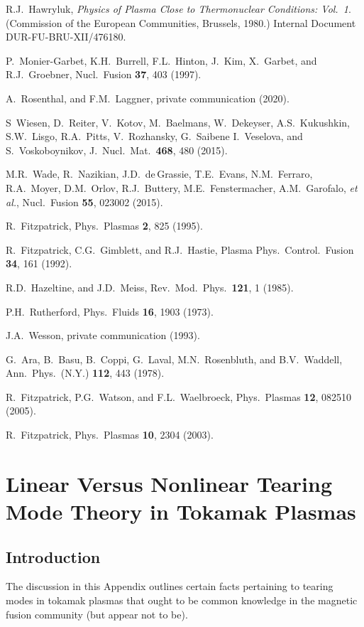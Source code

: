 \documentclass[12pt,prb,aps]{revtex4-1}
\begin{document}
\begin{thebibliography}{99}
 R.J.~Hawryluk, {\em Physics of Plasma Close to Thermonuclear Conditions: Vol.~1}. (Commission of the European Communities, Brussels, 1980.) 
Internal Document DUR-FU-BRU-XII/476180.

 P.~Monier-Garbet, K.H.~Burrell, F.L.~Hinton, J.~Kim, X.~Garbet, and R.J.~Groebner,   
Nucl.\ Fusion  {\bf 37}, 403 (1997).

 A.~Rosenthal, and F.M.~Laggner, private communication (2020).

 S~Wiesen, D.~Reiter, V.~Kotov, M.~Baelmans, W.~Dekeyser, A.S.~Kukushkin, S.W.~Lisgo, R.A.~Pitts, V.~Rozhansky, G.~Saibene I.~Veselova, and S.~Voskoboynikov,
J.\ Nucl.\ Mat.\ {\bf 468}, 480 (2015).

 M.R.~Wade, R.~Nazikian, J.D.~de\,Grassie, T.E.~Evans, N.M.~Ferraro, R.A.~Moyer, D.M.~Orlov, 
R.J.~Buttery, M.E.~Fenstermacher, A.M.~Garofalo, {\em et al.}, Nucl.\ Fusion {\bf 55}, 023002 (2015). 

 R.~Fitzpatrick,  Phys.\ Plasmas {\bf 2}, 825 (1995).

 R.~Fitzpatrick, C.G.~Gimblett, and R.J.~Hastie, 
Plasma Phys.\ Control.\ Fusion {\bf 34}, 161 (1992).

 R.D.~Hazeltine, and J.D.~Meiss, Rev.\ Mod.\ Phys.\ {\bf 121}, 1 (1985).

 P.H.~Rutherford,  Phys.\ Fluids  {\bf 16}, 1903 (1973).

 J.A.~Wesson, private communication (1993).

 G.~Ara,  B.~Basu, B.~Coppi, G.~Laval, M.N.~Rosenbluth, and B.V.~Waddell, Ann.\ Phys.\ (N.Y.) {\bf 112}, 443 (1978). 

 R.~Fitzpatrick, P.G.~Watson, and F.L.~Waelbroeck, Phys.\ Plasmas {\bf 12}, 082510 (2005).

 R.~Fitzpatrick, Phys.\ Plasmas {\bf 10}, 2304 (2003).

\end{thebibliography}

\appendix
\section{Linear Versus Nonlinear Tearing Mode Theory in Tokamak Plasmas}\label{appa}
\subsection{Introduction}
The discussion in this Appendix outlines certain facts pertaining
to tearing modes in tokamak plasmas that ought to be common knowledge in the 
magnetic fusion community (but appear not to be). 
\end{document}
